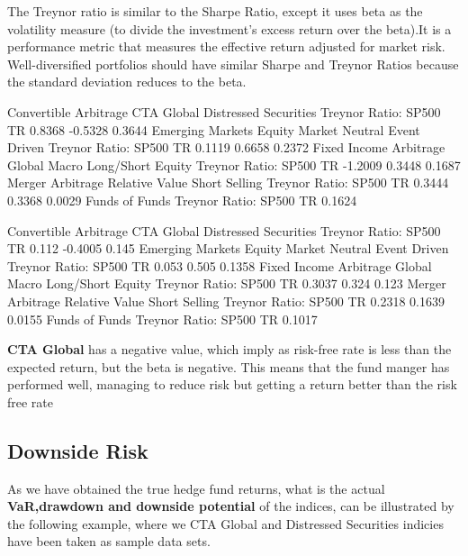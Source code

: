 \documentclass[12pt,letterpaper,english]{article}
\begin{document}
The Treynor ratio is similar to the Sharpe Ratio, except it uses beta as the volatility measure (to divide the investment's excess return over the beta).It is a performance metric that measures the effective return adjusted for market risk. Well-diversified portfolios should have similar Sharpe and Treynor Ratios because the standard deviation reduces to the beta.


\begin{Schunk}
\begin{Soutput}
                        Convertible Arbitrage CTA Global Distressed Securities
Treynor Ratio: SP500 TR                0.8368    -0.5328                0.3644
                        Emerging Markets Equity Market Neutral Event Driven
Treynor Ratio: SP500 TR           0.1119                0.6658       0.2372
                        Fixed Income Arbitrage Global Macro Long/Short Equity
Treynor Ratio: SP500 TR                -1.2009       0.3448            0.1687
                        Merger Arbitrage Relative Value Short Selling
Treynor Ratio: SP500 TR           0.3444         0.3368        0.0029
                        Funds of Funds
Treynor Ratio: SP500 TR         0.1624
\end{Soutput}
\begin{Soutput}
                        Convertible Arbitrage CTA Global Distressed Securities
Treynor Ratio: SP500 TR                 0.112    -0.4005                 0.145
                        Emerging Markets Equity Market Neutral Event Driven
Treynor Ratio: SP500 TR            0.053                 0.505       0.1358
                        Fixed Income Arbitrage Global Macro Long/Short Equity
Treynor Ratio: SP500 TR                 0.3037        0.324             0.123
                        Merger Arbitrage Relative Value Short Selling
Treynor Ratio: SP500 TR           0.2318         0.1639        0.0155
                        Funds of Funds
Treynor Ratio: SP500 TR         0.1017
\end{Soutput}
\end{Schunk}

\textbf{CTA Global} has a negative value, which imply  as risk-free rate is less than the expected return, but the beta is negative. This means that the fund manger has performed well, managing to reduce risk but getting a return better than the risk free rate

\subsection{Downside Risk}
As we have obtained the true hedge fund returns, what is the actual \textbf{VaR,drawdown and downside potential} of the indices, can be illustrated by the following example, where we CTA Global and Distressed Securities indicies have been taken as sample data sets.
\end{document}
